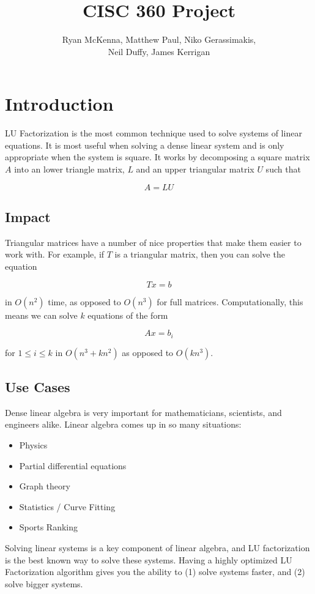 \documentclass[12]{article}
\title{CISC 360 Project}
\author{Ryan McKenna, Matthew Paul, Niko Gerassimakis,\\ Neil Duffy, James Kerrigan}
\begin{document}
\maketitle

\section{Introduction}

LU Factorization is the most common technique used to solve systems of linear equations.  It is most useful when solving a dense linear system and is only appropriate when the system is square.  It works by decomposing a square matrix $A$ into an lower triangle matrix, $L$ and an upper triangular matrix $U$ such that 

$$ A = LU $$

\subsection{Impact}

Triangular matrices have a number of nice properties that make them easier to work with.  For example, if $ T $ is a triangular matrix, then you can solve the equation

$$ T x = b $$ 

in $O(n^2)$ time, as opposed to $O(n^3)$ for full matrices.  Computationally, this means we can solve $k$ equations of the form 

$$ A x = b_i $$

for $ 1 \leq i \leq k $ in $ O(n^3 + k n^2) $ as opposed to $ O(k n^3) $.

\subsection{Use Cases}

Dense linear algebra is very important for mathematicians, scientists, and engineers alike.  Linear algebra comes up in so many situations:

\begin{itemize}
\setlength\itemsep{0.25em}
\item Physics
\item Partial differential equations
\item Graph theory
\item Statistics / Curve Fitting
\item Sports Ranking
\end{itemize}

Solving linear systems is a key component of linear algebra, and LU factorization is the best known way to solve these systems.  Having a highly optimized LU Factorization algorithm gives you the ability to (1) solve systems faster, and (2) solve bigger systems. 
\end{document}
